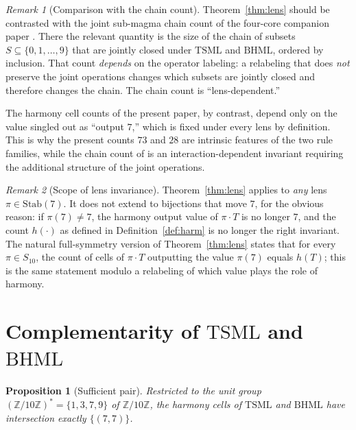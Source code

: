 \documentclass[11pt,reqno]{amsart}
\theoremstyle{plain}
\newtheorem{proposition}[theorem]{Proposition}
\theoremstyle{definition}
\theoremstyle{remark}
\newtheorem*{remark}{Remark}
\newcommand{\Z}{\mathbb{Z}}
\newcommand{\Zten}{\Z/10\Z}
\newcommand{\TSML}{\mathrm{TSML}}
\newcommand{\BHML}{\mathrm{BHML}}
\begin{document}
\begin{remark}[Comparison with the chain count]\label{rem:chain}
Theorem~\ref{thm:lens} should be contrasted with the joint
sub-magma chain count of the four-core companion paper
\cite{J15}. There the relevant quantity is the size of the chain
of subsets $S \subseteq \{0, 1, \ldots, 9\}$ that are jointly
closed under $\TSML$ and $\BHML$, ordered by inclusion. That count
\emph{depends} on the operator labeling: a relabeling that does
\emph{not} preserve the joint operations changes which subsets are
jointly closed and therefore changes the chain. The chain count is
``lens-dependent.''

The harmony cell counts of the present paper, by contrast, depend
only on the value singled out as ``output $7$,'' which is fixed
under every lens by definition. This is why the present counts
$73$ and $28$ are intrinsic features of the two rule families,
while the chain count of \cite{J15} is an interaction-dependent
invariant requiring the additional structure of the joint
operations.
\end{remark}

\begin{remark}[Scope of lens invariance]\label{rem:scope}
Theorem~\ref{thm:lens} applies to \emph{any} lens
$\pi \in \mathrm{Stab}(7)$. It does not extend to bijections that
move $7$, for the obvious reason: if $\pi(7) \ne 7$, the harmony
output value of $\pi \cdot T$ is no longer $7$, and the count
$h(\cdot)$ as defined in Definition~\ref{def:harm} is no longer
the right invariant. The natural full-symmetry version of
Theorem~\ref{thm:lens} states that for every $\pi \in S_{10}$,
the count of cells of $\pi \cdot T$ outputting the value $\pi(7)$
equals $h(T)$; this is the same statement modulo a relabeling of
which value plays the role of harmony.
\end{remark}

\section{Complementarity of $\TSML$ and $\BHML$}\label{sec:comp}

\begin{proposition}[Sufficient pair]\label{prop:complement}
Restricted to the unit group $(\Zten)^* = \{1, 3, 7, 9\}$ of
$\Zten$, the harmony cells of $\TSML$ and $\BHML$ have intersection
exactly $\{(7, 7)\}$.
\end{proposition}
\end{document}
